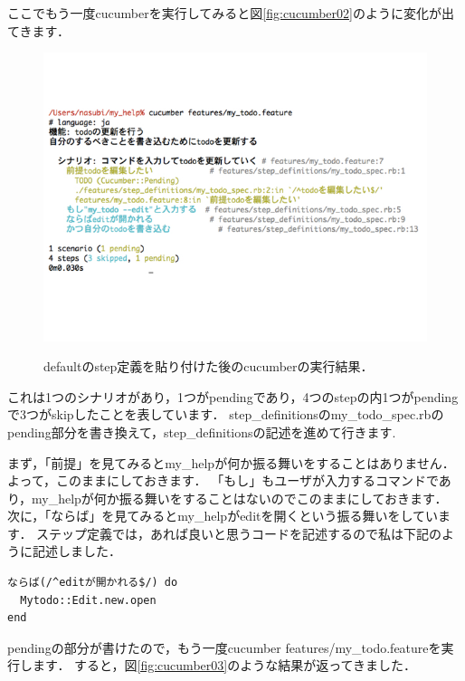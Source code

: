 ここでもう一度cucumberを実行してみると図\ref{fig:cucumber02}のように変化が出てきます．

\begin{figure}[htbp]\begin{center}
\includegraphics[width=12cm,bb= 0 0 937 753]{../figs/./cucumber02.001.jpg}
\caption{defaultのstep定義を貼り付けた後のcucumberの実行結果．}
\label{fig:cucumber02}
\label{default}\end{center}\end{figure}
これは1つのシナリオがあり，1つがpendingであり，4つのstepの内1つがpendingで3つがskipしたことを表しています．
step\_definitionsのmy\_todo\_spec.rbのpending部分を書き換えて，step\_definitionsの記述を進めて行きます.

まず，「前提」を見てみるとmy\_helpが何か振る舞いをすることはありません．
よって，このままにしておきます．
「もし」もユーザが入力するコマンドであり，my\_helpが何か振る舞いをすることはないのでこのままにしておきます．
次に，「ならば」を見てみるとmy\_helpがeditを開くという振る舞いをしています．
ステップ定義では，あれば良いと思うコードを記述するので私は下記のように記述しました．
\begin{lstlisting}[style=customCsh,basicstyle={\scriptsize\ttfamily}]
ならば(/^editが開かれる$/) do
  Mytodo::Edit.new.open
end
\end{lstlisting}
pendingの部分が書けたので，もう一度cucumber features/my\_todo.featureを実行します．
すると，図\ref{fig:cucumber03}のような結果が返ってきました．


